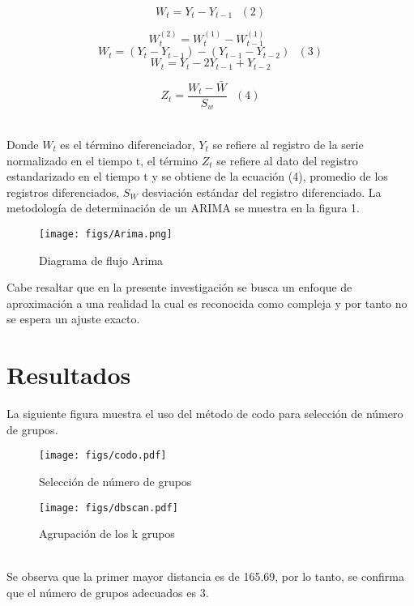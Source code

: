 \documentclass{article}
\begin{document}
$$W_t = Y_t - Y_{t-1} \ \ \ (2)$$

$$W_t^{(2)} = W_t^{(1)} - W_{t-1}^{(1)} \ \ \ $$
$$W_t = (Y_t - Y_{t-1}) - (Y_{t-1} - Y_{t-2}) \ \ \ (3)$$
$$W_t = Y_t - 2Y_{t-1} + Y_{t-2}$$

$$Z_t = \frac{W_t - \bar W}{S_w} \ \ \ (4)$$

\\

Donde $W_t$ es el término diferenciador, $Y_t$ se refiere al registro de la serie normalizado en el tiempo t, el término $Z_t$ se refiere al dato del registro estandarizado en el tiempo t y se obtiene de la ecuación (4), promedio de los registros diferenciados, $S_W$ desviación estándar del registro diferenciado. La metodología de determinación de un
ARIMA se muestra en la figura 1. 
\\

\begin{figure}
    \centering
    \texttt{[image: figs/Arima.png]}
    \caption{Diagrama de flujo Arima}
    \label{fig:Método de codo}
\end{figure}

Cabe resaltar que en la presente investigación se busca un enfoque de aproximación a una realidad la cual es reconocida como compleja y por tanto no se espera un ajuste exacto.

\section{Resultados}

La siguiente figura muestra el uso del método de codo para selección de número de grupos.
\\

\begin{figure}
    \centering
    \texttt{[image: figs/codo.pdf]}
    \caption{Selección de número de grupos}
    \label{fig:Método de codo}
\end{figure}

\begin{figure}
    \centering
    \texttt{[image: figs/dbscan.pdf]}
    \caption{Agrupación de los k grupos}
    \label{fig:Método de codo}
\end{figure}

\\

Se observa que la primer mayor distancia es de 165.69, por lo tanto, se confirma que el número de grupos adecuados es 3.
\\
\end{document}
